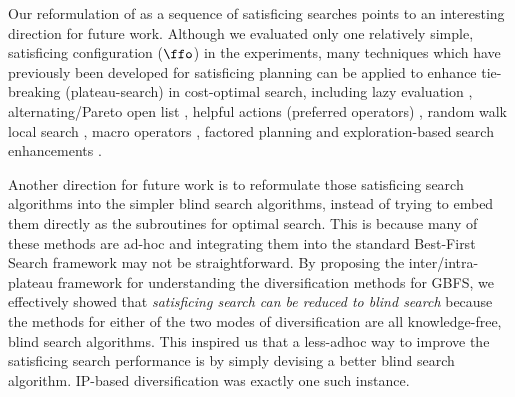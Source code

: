 Our reformulation of \astar as a sequence of satisficing searches  points to  an interesting direction for future work.
Although we evaluated only one relatively simple, satisficing configuration ($\ffo$) in
the experiments, many techniques which have previously been developed for satisficing planning can be applied
 to enhance tie-breaking (plateau-search) in cost-optimal search, including
lazy evaluation \cite{richter2010lama}, alternating/Pareto open
list \cite{RogerH10}, helpful actions (preferred operators) \cite{hoffmann01},
random walk local search \cite{nakhost2009monte}, macro operators
\cite{Botea2005,ChrpaVM15}, factored planning
\cite{amir2003factored,brafman2006factored,Asai2015} and
exploration-based search enhancements
\cite{valenzano2014comparison,xie14type,Valenzano2016}.

Another direction for future work is to reformulate those
satisficing search algorithms into the simpler blind search algorithms,
instead of trying to embed them directly as the subroutines for optimal search.
This is because many of these methods are ad-hoc and 
integrating them into the standard Best-First Search framework may not be straightforward.
% 
By proposing the inter/intra-plateau framework for understanding the diversification methods for GBFS,
we effectively showed that \emph{satisficing search can be reduced to blind search}
because the methods for either of the two modes of diversification are all knowledge-free, blind search algorithms.
This inspired us that a less-adhoc way to improve the satisficing search performance
is by simply devising a better blind search algorithm.
IP-based diversification was exactly one such instance.

